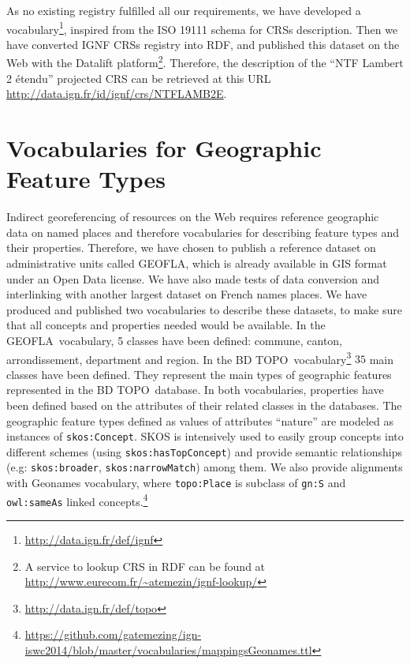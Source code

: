 As no existing registry fulfilled all our requirements, we have developed a vocabulary\footnote{\url{http://data.ign.fr/def/ignf}}, inspired from the ISO 19111 schema for CRSs description. Then we have converted IGNF CRSs registry into RDF, and published this dataset on the Web with the Datalift platform\footnote{A service to lookup CRS in RDF can be found at \url{http://www.eurecom.fr/~atemezin/ignf-lookup/}}. Therefore, the description of the ``NTF Lambert 2 \'{e}tendu'' projected CRS can be retrieved at this URL \url{http://data.ign.fr/id/ignf/crs/NTFLAMB2E}.

\section{Vocabularies for Geographic Feature Types}
\label{sec:geovocab}

Indirect georeferencing of resources on the Web requires reference geographic data on named places and therefore vocabularies for describing feature types and their properties. Therefore, we have chosen to publish a reference dataset on administrative units called GEOFLA\circledR, which is already available in GIS format under an Open Data license. We have also made tests of data conversion and interlinking with another largest dataset on French names places. We have produced and published two vocabularies to describe these datasets, to make sure that all concepts and properties needed would be available.
In the GEOFLA\circledR ~vocabulary, 5 classes have been defined: commune, canton, arrondissement, department and region. In the BD TOPO\circledR ~vocabulary\footnote{\url{http://data.ign.fr/def/topo}} \emph{}$35$ main classes have been defined. They represent the main types of geographic features represented in the BD TOPO\circledR ~database. In both vocabularies, properties have been defined based on the attributes of their related classes in the databases. The geographic feature types defined as values of attributes ``nature'' are modeled as instances of \texttt{skos:Concept}. SKOS is intensively used to easily group concepts into different schemes (using \texttt{skos:hasTopConcept}) and provide semantic relationships (e.g: \texttt{skos:broader}, \texttt{skos:narrowMatch}) among them. We also provide alignments with Geonames vocabulary, where \texttt{topo:Place} is subclass of \texttt{gn:S} and \texttt{owl:sameAs} linked concepts.\footnote{\url{https://github.com/gatemezing/ign-iswc2014/blob/master/vocabularies/mappingsGeonames.ttl}} 

